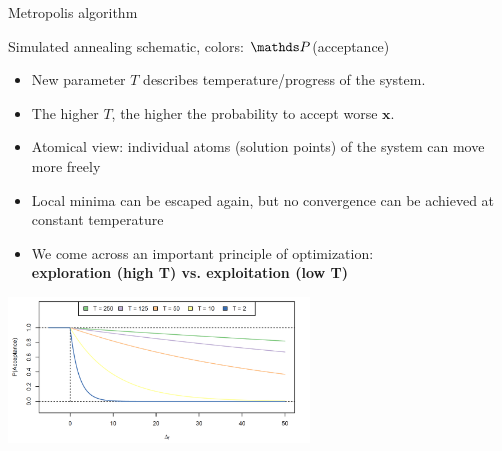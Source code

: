 \documentclass[11pt,compress,t,notes=noshow, xcolor=table]{beamer}
\begin{document}
\begin{vbframe}{Metropolis algorithm}



\footnotesize{Simulated annealing schematic, colors: $\P$(acceptance)}

\framebreak

\begin{small}
\begin{itemize}
\item New parameter $T$ describes temperature/progress of the system.
\item The higher $T$, the higher the probability to accept worse $\bm{x}$.
\item Atomical view: individual atoms (solution points) of the system can move more freely
\item Local minima can be escaped again, but no convergence can be achieved at constant temperature
\item We come across an important principle of optimization:\\
  \textbf{exploration (high T) vs. exploitation (low T)}
\end{itemize}
\end{small}
\vspace{-0.3cm}
\begin{center}
\includegraphics[width=0.6\textwidth]{figure_man/metropolis-algorithm2.png}
\end{center}



\end{vbframe}
\end{document}
